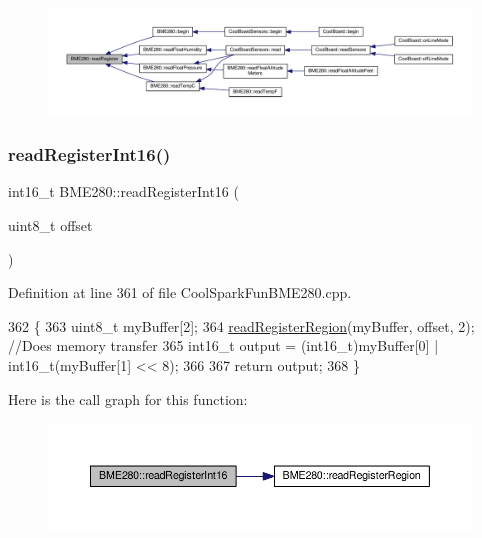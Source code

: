 \begin{figure}[H]
\begin{center}
\leavevmode
\includegraphics[width=350pt]{df/dcf/class_b_m_e280_a1bbd14c8591966df531e40085342ff71_icgraph}
\end{center}
\end{figure}
\mbox{\label{class_b_m_e280_ac43c30f9b321d301694094d6b4bebe7e}} 
\subsubsection{\texorpdfstring{read\+Register\+Int16()}{readRegisterInt16()}}
{\footnotesize\ttfamily int16\+\_\+t B\+M\+E280\+::read\+Register\+Int16 (\begin{DoxyParamCaption}\item[{uint8\+\_\+t}]{offset }\end{DoxyParamCaption})}



Definition at line 361 of file Cool\+Spark\+Fun\+B\+M\+E280.\+cpp.


\begin{DoxyCode}
362 \{
363     uint8\_t myBuffer[2];
364     \hyperlink{class_b_m_e280_aecca87c2c40a7f2bcabcea921bdc6124}{readRegisterRegion}(myBuffer, offset, 2);  \textcolor{comment}{//Does memory transfer}
365     int16\_t output = (int16\_t)myBuffer[0] | int16\_t(myBuffer[1] << 8);
366     
367     \textcolor{keywordflow}{return} output;
368 \}
\end{DoxyCode}
Here is the call graph for this function\+:\nopagebreak
\begin{figure}[H]
\begin{center}
\leavevmode
\includegraphics[width=350pt]{df/dcf/class_b_m_e280_ac43c30f9b321d301694094d6b4bebe7e_cgraph}
\end{center}
\end{figure}
\mbox{\label{class_b_m_e280_aecca87c2c40a7f2bcabcea921bdc6124}} 
